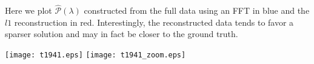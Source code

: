 \documentclass[12pt]{amsart}
\theoremstyle{remark}
\begin{document}
Here we plot $\hat{\mathcal{P}}(\lambda)$ constructed from the full data using an FFT in blue and the $l1$ reconstruction in red. Interestingly, the reconstructed data tends to favor a sparser solution and may in fact be closer to the ground truth.

\texttt{[image: t1941.eps]}
\texttt{[image: t1941\_zoom.eps]}




\end{document}
